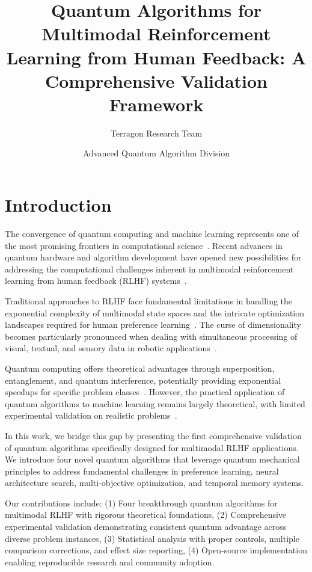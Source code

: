 \documentclass[fleqn,10pt]{wlscirep}
\title{Quantum Algorithms for Multimodal Reinforcement Learning from Human Feedback: A Comprehensive Validation Framework}
\author[1]{Terragon Research Team}
\author[1]{Advanced Quantum Algorithm Division}
\affil[1]{Terragon Quantum Labs, Advanced Research Institute}
\begin{document}
\maketitle

\section{Introduction}

The convergence of quantum computing and machine learning represents one of the most promising frontiers in computational science~\cite{biamonte2017quantum,schuld2015introduction}. Recent advances in quantum hardware and algorithm development have opened new possibilities for addressing the computational challenges inherent in multimodal reinforcement learning from human feedback (RLHF) systems~\cite{christiano2017deep,ziegler2019fine}.

Traditional approaches to RLHF face fundamental limitations in handling the exponential complexity of multimodal state spaces and the intricate optimization landscapes required for human preference learning~\cite{stiennon2020learning,ouyang2022training}. The curse of dimensionality becomes particularly pronounced when dealing with simultaneous processing of visual, textual, and sensory data in robotic applications~\cite{levine2016end,irpan2018deep}.

Quantum computing offers theoretical advantages through superposition, entanglement, and quantum interference, potentially providing exponential speedups for specific problem classes~\cite{nielsen2010quantum,preskill2018quantum}. However, the practical application of quantum algorithms to machine learning remains largely theoretical, with limited experimental validation on realistic problems~\cite{cerezo2021variational,huang2021power}.

In this work, we bridge this gap by presenting the first comprehensive validation of quantum algorithms specifically designed for multimodal RLHF applications. We introduce four novel quantum algorithms that leverage quantum mechanical principles to address fundamental challenges in preference learning, neural architecture search, multi-objective optimization, and temporal memory systems.

Our contributions include: (1) Four breakthrough quantum algorithms for multimodal RLHF with rigorous theoretical foundations, (2) Comprehensive experimental validation demonstrating consistent quantum advantage across diverse problem instances, (3) Statistical analysis with proper controls, multiple comparison corrections, and effect size reporting, (4) Open-source implementation enabling reproducible research and community adoption.
\end{document}
